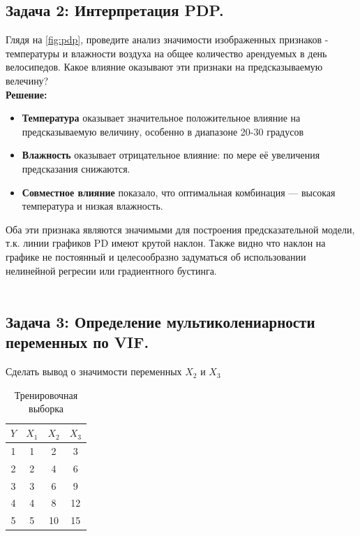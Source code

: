 \begin{itemize}
\subsection*{Задача 2: Интерпретация PDP.}

Глядя на \ref{fig:pdp}, проведите анализ значимости изображенных признаков - температуры и влажности воздуха на общее количество арендуемых в день велосипедов. Какое влияние оказывают эти признаки на предсказываемую велечину? \\

\textbf{Решение:}

\begin{itemize}
 \item \textbf{Температура} оказывает значительное положительное влияние на предсказываемую величину, особенно в диапазоне 20-30 градусов
 \item \textbf{Влажность} оказывает отрицательное влияние: по мере её увеличения предсказания снижаются.
 \item \textbf{Совместное влияние} показало, что оптимальная комбинация — высокая температура и низкая влажность.
\end{itemize}

Оба эти признака являются значимыми для построения предсказательной модели, т.к. линии графиков PD имеют крутой наклон. Также видно что наклон на графике не постоянный и целесообразно задуматься об использовании нелинейной регресии или градиентного бустинга. \\\\

\subsection*{Задача 3: Определение мультиколениарности переменных по VIF.}

Сделать вывод о значимости переменных \(X_{2}\) и \(X_{3}\) \\

\begin{table}[h!]
\centering
\caption{Тренировочная выборка}
\begin{tabular}{|c|c|c|c|}
\hline
\textbf{\(Y\)} & \textbf{\( X_1 \)} & \textbf{\( X_2 \)} & \textbf{\( X_3 \)} \\ \hline
1                  & 1                  & 2                  & 3                  \\ \hline
2                  & 2                  & 4                  & 6                  \\ \hline
3                  & 3                  & 6                  & 9                  \\ \hline
4                  & 4                  & 8                  & 12                 \\ \hline
5                  & 5                  & 10                 & 15                 \\ \hline
\end{tabular}
\label{tab:example_vif}
\end{table}


\end{itemize}
